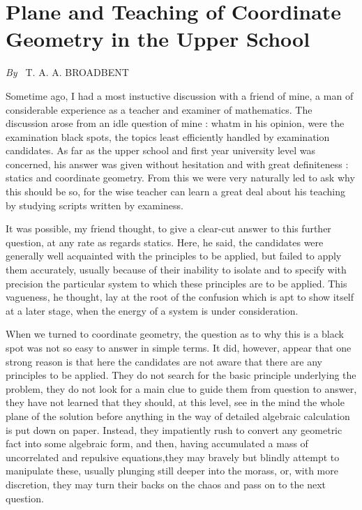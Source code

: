 
\chapter{Plane and Teaching of Coordinate Geometry in the Upper
  School}

\begin{center}
{\em By~} T. A. A. BROADBENT
\end{center}

\setcounter{pageoriginal}{28}
Some\pageoriginale time ago, I had a most instuctive discussion with a friend of
mine, a man of considerable experience as a teacher and examiner of
mathematics. The discussion arose from an idle question of mine :
whatm in his opinion, were the examination black spots, the topics
least efficiently handled by examination candidates. As far as the
upper school and first year university level was concerned, his answer
was given without hesitation and with great definiteness : statics and
coordinate geometry. From this we were very naturally led to ask why
this should be so, for the wise teacher can learn a great deal about
his teaching by studying scripts written by examiness.

It was possible, my friend thought, to give a clear-cut answer to this
further question, at any rate as regards statics. Here, he said, the
candidates were generally well acquainted with the principles to be
applied, but failed to apply them accurately, usually because of their
inability to isolate and to specify with precision the particular
system to which these principles are to be applied. This vagueness, he
thought, lay at the root of the confusion which is apt to show itself
at a later stage, when the energy of a system is under consideration.

When we turned to coordinate geometry, the question as to why this is
a black spot was not so easy to answer in simple terms. It did,
however, appear that one strong reason is that here the candidates are
not aware that there are any principles to be applied. They do not
search for the basic principle underlying the problem, they do not
look for a main clue to guide them from question to answer, they have
not learned that they should, at this level, see in the mind the whole
plane of the solution before anything in the way of detailed algebraic
calculation is put down on paper. Instead, they impatiently rush to
convert any geometric fact into some algebraic form, and then, having
accumulated a mass of uncorrelated and repulsive
equations,\pageoriginale they may bravely but blindly attempt to
manipulate these, usually plunging still deeper into the morass, or,
with more discretion, they may turn their backs on the chaos and pass
on to the next question.

